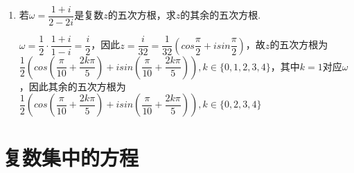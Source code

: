 \begin{enumerate}
\begin{jieda}
    \end{jieda}
    \item 若$\omega = \dfrac{1+i}{2-2i}$是复数$z$的五次方根，求$z$的其余的五次方根.
    \begin{jieda}
        $\omega = \dfrac{1}{2} \cdot \dfrac{1+i}{1-i} = \dfrac{i}{2}$，因此$z = \dfrac{i}{32} = \dfrac{1}{32}\left(cos\dfrac{\pi}{2} + i sin\dfrac{\pi}{2}\right)$，故$z$的五次方根为$\dfrac{1}{2}\left(cos\left(\dfrac{\pi}{10}+\dfrac{2k\pi}{5}\right) + i sin\left(\dfrac{\pi}{10} + \dfrac{2k\pi}{5}\right)\right), k \in \{0,1,2,3,4\}$，其中$k = 1$对应$\omega$，因此其余的五次方根为$\dfrac{1}{2}\left(cos\left(\dfrac{\pi}{10}+\dfrac{2k\pi}{5}\right) + i sin\left(\dfrac{\pi}{10} + \dfrac{2k\pi}{5}\right)\right), k \in \{0,2,3,4\}$
    \end{jieda}
\end{enumerate}
\section*{复数集中的方程}
